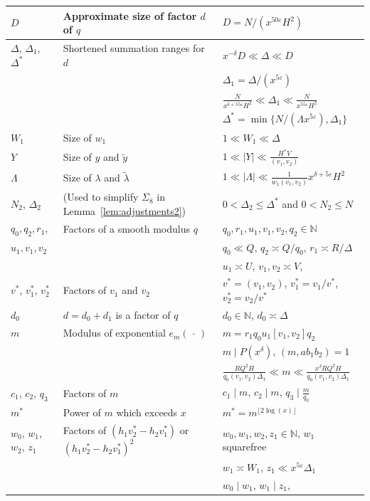 \documentclass{amsart}
\numberwithin{equation}{section}
\begin{document}
\begin{center}
\begin{tabular}{ | l | l | l |}
 $D$ & Approximate size of factor $d$ of  $q$   & $D= N/(x^{50\varepsilon}H^2) $
 \\ \hline 
 $\Delta$, $\Delta_1$, $\Delta^*$ & Shortened summation ranges for $d$   & $x^{-\delta} D \ll \Delta \ll D$
 \\ &  & $\Delta_1 = \Delta/(x^{5\varepsilon})$ \\ & &  $ \frac{N}{x^{\delta + 55\varepsilon}H^2} \ll \Delta_1 \ll \frac{N}{x^{ 55\varepsilon}H^2}  $
  \\ & & $\Delta^* = \min\{N/(\Lambda x^{5\varepsilon}), \Delta_1\}$
  \\ \hline
  $W_1$ & Size of $w_1$ & $1 \ll W_1 \ll \Delta$
 \\ \hline
 $Y$ & Size of $y$ and $\widetilde{y}$ & $1\ll |Y| \ll \frac{H^* V}{(v_1,v_2)}$
  \\ \hline
  $\Lambda$ &  Size of  $\lambda$ and $\widetilde{\lambda}$ & $1 \ll |\Lambda| \ll \frac{1}{w_1 (v_1,v_2)}x^{\delta +5\varepsilon} H^2$
  \\ \hline
$N_2$, $\Delta_2$ & (Used to simplify $\Sigma_8$ in Lemma~\ref{lem:adjustments2}) & $0<\Delta_2 \leq \Delta^*$   and $0<N_2 \leq N$
   \\ \hline
    $q_0, q_2, r_1$,    & Factors of a smooth modulus $q$ &   $q_0, r_1, u_1, v_1, v_2, q_2 \in \mathbb{N}$  
 \\ $u_1, v_1, v_2$ & &  $q_0 \ll Q$, $q_2 \asymp Q/q_0$,  $r_1 \asymp R/\Delta$ \\ & & $u_1 \asymp U$, $v_1, v_2 \asymp V$,  \\ \hline
 $v^*$, $v_1^*$, $v_2^*$  & Factors of $v_1$ and $v_2$ & $v^* = (v_1,v_2)$, $v_1^*=v_1/v^*$,  $v_2^*=v_2/v^*$
 \\ \hline  
 $d_0$ & $d=d_0+d_1$ is a factor of  $q$ &  $d_0 \in \mathbb{N}$, $d_0 \asymp \Delta$
 \\ \hline
 $m$ & Modulus of exponential $e_m(\,\cdot \,)$ & $m =  r_1q_0u_1[v_1,v_2]q_2$ \\ & & $m \mid P(x^\delta)$, $(m,ab_1b_2)=1$ \\ & & $\frac{RQ^2H}{q_0 (v_1,v_2)\Delta_1} \ll m \ll \frac{x^\delta RQ^2H}{q_0 (v_1,v_2)\Delta_1}$
  \\ \hline 
        $c_1$, $c_2$, $q_3$ & Factors of $m$ & $c_1 \mid m$, $c_2 \mid m$, $q_3 \mid \frac{m}{q_0}$
        \\ \hline 
  $m^*$ & Power of $m$ which exceeds $x$ & $m^*=m^{\lfloor 2\log(x) \rfloor}$
  \\ \hline 
          $w_0$, $w_1$, $w_2$, $z_1$  & Factors of $(h_1v_2^*-h_2v_1^*)$ or $(h_1v_2^*-h_2v_1^*)^2$ & $w_0, w_1, w_2, z_1\in \mathbb{N}$,  $w_1$ squarefree\\ & &  $w_1 \asymp W_1$,  $z_1 \ll x^{5\varepsilon} \Delta_1$\\ &  &  $w_0 \mid w_1$, $w_1 \mid z_1$, 

\end{tabular}
\end{center}
\end{document}
